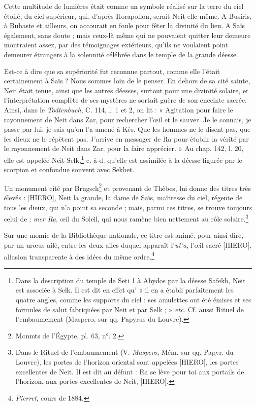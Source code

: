 \documentclass[a4paper, 11pt, oneside]{article}
\begin{document}
Cette multitude de lumières était comme un symbole réalisé sur la terre du ciel étoilé, du ciel supérieur, qui, d'après Horapollon, serait Neit elle-même. A Busiris, à Bubaste et ailleurs, on accourait en foule pour fêter la divinité du lieu. A Saïs également, sans doute ; mais ceux-là même qui ne pouvaient quitter leur demeure montraient assez, par des témoignages extérieurs, qu'ils ne voulaient point demeurer étrangers à la solennité célébrée dans le temple de la grande déesse.

Est-ce à dire que sa supériorité fut reconnue partout, comme elle l'était certainement à Saïs ? Nous sommes loin de le penser. En dehors de sa cité sainte, Neit était tenue, ainsi que les autres déesses, surtout pour une divinité solaire, et l'interprétation complète de ses mystères ne sortait guère de son enceinte sacrée. Ainsi, dans le \emph{Todtenbuch}, C. 114, l. 1 et 2, on lit : « Agitation pour faire le rayonnement de Neit dans Zar, pour rechercher l'œil et le sauver. Je le connais, je passe par lui, je sais qu'on l’a amené à Kès. Que les hommes ne le disent pas, que les dieux ne le répètent pas. J'arrive en messager de Ra pour établir la vérité par le rayonnement de Neit dans Zar, pour la faire apprécier. » Au chap. 142, l. 20, elle est appelée Neit-Selk,\footnote{Dans la description du temple de Seti 1 à Abydos par la déesse Safekh, Neit est associée à Selk. Il est dit en effet qu' « il en a établi parfaitement les quatre angles, comme les supports du ciel : ses amulettes ont été émises et ses formules de salut fabriquées par Neit et par Selk ; » \emph{etc.} Cf. aussi Rituel de l'embaumement (Maspero, sur qq. Papyrus du Louvre).} c.-à-d. qu'elle est assimilée à la déesse figurée par le scorpion et confondue souvent avec Sekhet.

Un monument cité par Brugsch\footnote{Monmts de l'Égypte, pl. 63, n°. 2.} et provenant de Thèbes, lui donne des titres très élevés : [HIERO], Neit la grande, la dame de Saïs, maîtresse du ciel, régente de tous les dieux, qui n'a point sa seconde ; mais, parmi ces titres, se trouve toujours celui de : \emph{mer Ra}, œil du Soleil, qui nous ramène bien nettement au rôle solaire.\footnote{Dans le Rituel de l'embaumement (V. \emph{Maspero}, Mém. sur qq. Papyr. du Louvre), les portes de l'horizon oriental sont appelées [HIERO], les portes excellentes de Neit. Il est dit au défunt : Ra se lève pour toi aux portails de l'horizon, aux portes excellentes de Neit, [HIERO].}

Sur une momie de la Bibliothèque nationale, ce titre est animé, pour ainsi dire, par un urœus ailé, entre les deux ailes duquel apparaît l'\emph{ut'a}, l'œil sacré [HIERO], allusion transparente à des idées du même ordre.\footnote{\emph{Pierret}, cours de 1884.}
\end{document}
